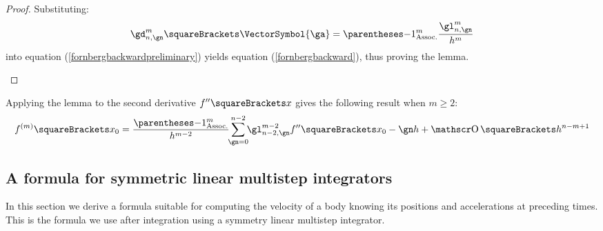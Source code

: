 \documentclass[10pt, a4paper, twoside]{basestyle}
\begin{document}
\begin{lemma}
\begin{proof}
Substituting:
\[
\gd^{m}_{n,\gn}\of{\VectorSymbol{\ga}} = \pa{-1}^m \frac{\gl^{m}_{n,\gn}}{h^m}
\]
into equation (\ref{fornbergbackwardpreliminary}) yields equation (\ref{fornbergbackward}), thus proving the lemma.

\vspace{-\belowdisplayskip}\[\]
\end{proof}
\end{lemma}

\begin{corollary}
Applying the lemma to the second derivative $f\dersecond\of{x}$ gives the following result when $m ≥ 2$:
\begin{equation}
f^{(m)}\of{x_0} = \frac{\pa{-1}^m}{h^{m - 2}} \sum{\gn = 0}[n - 2]{\gl^{m - 2}_{n - 2,\gn} f\dersecond\of{x_0 - \gn h}} + \BigO\of{h^{n - m + 1}}
\label{eqnfornbergbackward2}
\end{equation}
\end{corollary}

\subsection*{A formula for symmetric linear multistep integrators}
In this section we derive a formula suitable for computing the velocity of a body knowing its positions and accelerations at preceding times.  This is the formula we use after integration using a symmetry linear multistep integrator.
\end{document}
